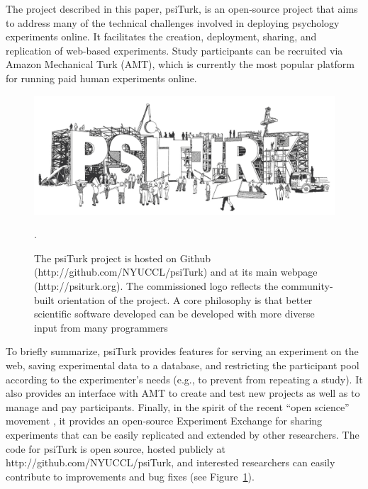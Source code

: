 \documentclass[twocolumn]{svjour3}          %
\newcommand{\psiturk}[0]{\textsf{psiTurk}}
\begin{document}
The project described in this paper, \psiturk{}, is an open-source project that aims to address many of the technical challenges
involved in deploying psychology experiments online.
It facilitates the creation, deployment, sharing, and replication of web-based experiments.
Study participants can be recruited via Amazon 
Mechanical Turk (AMT), which is currently the most popular platform for running 
paid human experiments online.

\begin{figure}[tp]
\centering
\includegraphics[scale=.30]{figures/psiturk_logo.jpg}
\caption{The \psiturk{} project is hosted on Github 
(\textsf{http://github.com/NYUCCL/psiTurk}) and at its main webpage (\textsf{http://psiturk.org}). 
The commissioned logo reflects the community-built orientation of the project.  A 
core philosophy is that better scientific software developed can be developed 
with more diverse input from many programmers~\citep{Raymond:1999zt}}.
\label{fig:logo}
\end{figure}

To briefly summarize, \psiturk{} provides features for serving an 
experiment on the web, saving experimental data to a database, and restricting the 
participant pool according to the experimenter's needs (e.g., to prevent from repeating a study). It also provides an interface with AMT to 
create and test new projects as well as to manage and pay participants. Finally, in 
the spirit of the recent ``open science'' movement \citep{Collaboration:2012vf},
it provides  an open-source Experiment Exchange for sharing experiments 
that can be easily replicated and extended by other researchers.  The code for 
\psiturk{} is open source, hosted publicly at
\textsf{http://github.com/NYUCCL/psiTurk}, and interested researchers can easily 
contribute to improvements and bug fixes (see Figure~\ref{fig:logo}).
\end{document}
